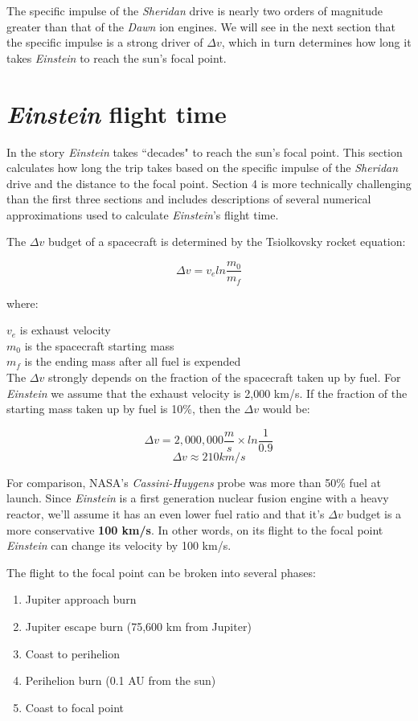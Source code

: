 \documentclass[12pt]{article} %
\begin{document}
The specific impulse of the \textit{Sheridan} drive is nearly two orders of magnitude greater than that of the \textit{Dawn} ion engines. We will see in the next section that the specific impulse is a strong driver of $\Delta v$, which in turn determines how long it takes \textit{Einstein} to reach the sun's focal point.

\section{\textit{Einstein} flight time}
\label{sec:flighttime}
In the story \textit{Einstein} takes ``decades" to reach the sun's focal point. This section calculates how long the trip takes based on the specific impulse of the \textit{Sheridan} drive and the distance to the focal point. Section 4 is more technically challenging than the first three sections and includes descriptions of several numerical approximations used to calculate \textit{Einstein}'s flight time.

The $\Delta v$ budget of a spacecraft is determined by the Tsiolkovsky rocket equation:

$$\Delta v = v_e ln \frac{m_0}{m_f}$$

where:

$v_e$ is exhaust velocity\\
$m_0$ is the spacecraft starting mass\\
$m_f$ is the ending mass after all fuel is expended\\

The $\Delta v$ strongly depends on the fraction of the spacecraft taken up by fuel. For \textit{Einstein} we assume that the exhaust velocity is 2,000 km/s. If the fraction of the starting mass taken up by fuel is 10\%, then the $\Delta v$ would be: 

$$\Delta v = 2,000,000\frac{m}{s} \times ln \frac{1}{0.9}$$
$$\Delta v \approx 210 km/s$$ 


For comparison, NASA's \textit{Cassini-Huygens} probe was more than 50\% fuel at launch. Since \textit{Einstein} is a first generation nuclear fusion engine with a heavy reactor, we'll assume it has an even lower fuel ratio and that it's $\Delta v$ budget is a more conservative \textbf{100 km/s}. In other words, on its flight to the focal point \textit{Einstein} can change its velocity by 100 km/s.

The flight to the focal point can be broken into several phases:
\begin{enumerate}
\item Jupiter approach burn
\item Jupiter escape burn (75,600 km from Jupiter)
\item Coast to perihelion 
\item Perihelion burn (0.1 AU from the sun)
\item Coast to focal point
\end{enumerate}
\end{document}
